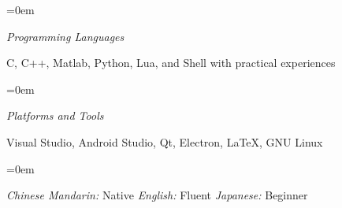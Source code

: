 \documentclass{scrartcl}
\newlength{\datebox}\settowidth{\datebox}{Spring 2014} %
\newcommand{\NewEntry}[3]{\noindent\hangindent=0em\hangafter=0 \parbox{\datebox}{\small \textit{#1}}\hspace{1.5em} #2 #3 %
\vspace{0.5em}} %
\newcommand{\Description}[1]{\hangindent=0em\hangafter=0\noindent\raggedright\footnotesize{#1}\par\normalsize\vspace{1em}} %
\begin{document}
\begin{cv}{}
\vspace{1em}

\NewEntry{Programming Languages}{C, C++, Matlab, Python, Lua, and Shell with practical experiences}

\vspace{0.5em} %

\NewEntry{Platforms and Tools}{Visual Studio, Android Studio, Qt, Electron, \LaTeX, GNU Linux}

\vspace{1.5em} %


\vspace{0.5em}

\Description{\textit{Chinese Mandarin: } Native  \qquad   \textit{English: } Fluent \qquad \textit{Japanese: } Beginner}


\end{cv}
\end{document}
